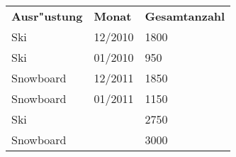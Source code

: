 \bigskip

\begin{tabular}{ l l l }
    \rowcolor{LightSlateGray}
    \textbf{Ausr"ustung} & \textbf{Monat} & \textbf{Gesamtanzahl}\\
    Ski         & 12/2010   & 1800\\
    Ski         & 01/2010   & 950\\
    Snowboard   & 12/2011   & 1850\\
    Snowboard   & 01/2011   & 1150\\
    Ski         &           & 2750\\
    Snowboard   &           & 3000\\
\end{tabular}



